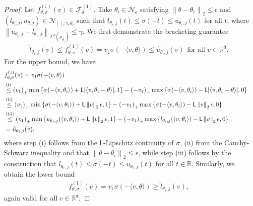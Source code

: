 \documentclass[11pt]{article}
\newcommand{\R}{\mathbb{R}} %
\newcommand{\mc}[1]{\mathcal{#1}}
\newcommand{\norm}[1]{\left\|{#1}\right\|} %
\newcommand{\what}[1]{\widehat{#1}}
\newcommand{\lipconst}{\mathsf{L}}
\newcommand{\ltwo}[1]{\norm{#1}_2} %
\newcommand{\<}{\langle} %
\renewcommand{\>}{\rangle}
\newcommand{\hinge}[1]{\left({#1}\right)_+}
\begin{document}
\begin{proof}
	Let $f_{\theta, \sigma}^{(1)}(v) \in \mathcal{F}_\delta^{(1)}$.
	Take $\theta_i \in \mathcal{N}_{\epsilon}$ satisfying
	$\ltwo{\theta - \theta_i} \leq \epsilon$ and
	$(l_{\theta_i, j}, u_{\theta,j}) \in \mc{N}_{[\,], \gamma, \theta_i}$
	such that $l_{\theta_i, j}(t) \leq  \sigma(-t) \leq u_{\theta_i, j}(t)$
	for all $t$, where $\norm{u_{\theta_i,j} - l_{\theta_i,j}}_{L^4(\mu_{\theta_i})}
	\le \gamma$. We first demonstrate the bracketing guarantee
	\begin{align*}
		\what{l}_{\theta_i, j}(v)
		\leq f_{\theta, \sigma}^{(1)}(v) = v_1 \sigma(-\<v, \theta\>)
		\leq \what{u}_{\theta_i, j}(v)
		~~ \mbox{for~all~} v \in \R^d.
	\end{align*}
	For the upper bound, we have
	\begin{align*}
		\lefteqn{f_{\theta, \sigma}^{(1)}(v) = v_1 \sigma(-\<v, \theta\>)}
		\\
		& \stackrel{\mathrm{(i)}}{\leq}
		\hinge{v_1} \min \left\{\sigma(-\<v, \theta_i\>) + \lipconst |\<v, \theta_i - \theta\>|, 1\right\}
		- \hinge{-v_1} \max \left\{\sigma(-\<v, \theta_i\>) - \lipconst |\<v, \theta_i - \theta\>|, 0\right\} \\
		& \stackrel{\mathrm{(ii)}}{\leq} \hinge{v_1}
		\min \left\{\sigma(-\<v, \theta_i\>) + \lipconst \ltwo{v} \epsilon, 1\right\}
		- \hinge{-v_1} \max \left\{\sigma(-\<v, \theta_i\>) - \lipconst \ltwo{v} \epsilon, 0\right\} \\
		& \stackrel{\mathrm{(iii)}}{\leq}
		\hinge{v_1} \min\left\{u_{\theta_i, j}(\<v, \theta_i\>) + \lipconst \ltwo{v} \epsilon, 1 \right\}
		- \hinge{-v_1} \max\left\{l_{\theta_i, j}(\<v, \theta_i\>) - \lipconst \ltwo{v} \epsilon, 0 \right\} \\
		& = \what{u}_{\theta_i, j}(v),
	\end{align*}
	where step (i) follows from the $\lipconst$-Lipschitz continuity of
	$\sigma$, (ii) from the Cauchy-Schwarz inequality and
	that $\ltwo{\theta - \theta_i} \le \epsilon$,
	while step (iii) follows
	by the construction that
	$l_{\theta_i, j}(t) \leq \sigma(-t) \leq u_{\theta_i,
		j}(t)$ for all $t \in \R$.
	Similarly, we obtain the lower bound
	\begin{align*}
		f_{\theta, \sigma}^{(1)}(v) = v_1 \sigma(-\<v, \theta\>) 
		\geq \what{l}_{\theta_i, j}(v),
	\end{align*}
	again valid for all $v \in \R^d$.
	

\end{proof}
\end{document}
